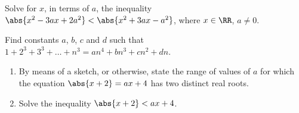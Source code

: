 \begin{problem}[C]
    Solve for $x$, in terms of $a$, the inequality $\abs{x^2 - 3ax + 2a^2} < \abs{x^2 + 3ax - a^2}$, where $x \in \RR$, $a \neq 0$.
\end{problem}

\begin{problem}[C]
    Find constants $a$, $b$, $c$ and $d$ such that $1 + 2^3 + 3^3 + \dots + n^3 = an^4 + bn^3 + cn^2 + dn$.
\end{problem}

\begin{problem}[C]
    \begin{enumerate}
        \item By means of a sketch, or otherwise, state the range of values of $a$ for which the equation $\abs{x + 2} = ax + 4$ has two distinct real roots.
        \item Solve the inequality $\abs{x + 2} < ax + 4$.
    \end{enumerate}
\end{problem}